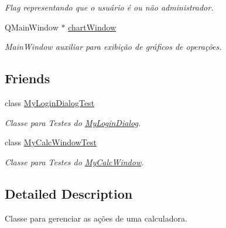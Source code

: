 \begin{DoxyCompactItemize}
\begin{DoxyCompactList}\small\item\em Flag representando que o usuário é ou não administrador. \end{DoxyCompactList}\item 
Q\+Main\+Window $\ast$ \hyperlink{classMyCalcWindow_a98ecf548e0cb3586ff4afc33bdfacb7a}{chart\+Window}\hypertarget{classMyCalcWindow_a98ecf548e0cb3586ff4afc33bdfacb7a}{}\label{classMyCalcWindow_a98ecf548e0cb3586ff4afc33bdfacb7a}

\begin{DoxyCompactList}\small\item\em Main\+Window auxiliar para exibição de gráficos de operações. \end{DoxyCompactList}\end{DoxyCompactItemize}
\subsection*{Friends}
\begin{DoxyCompactItemize}
\item 
class \hyperlink{classMyCalcWindow_aec613ce0d143a48322f72a2b90819fcb}{My\+Login\+Dialog\+Test}\hypertarget{classMyCalcWindow_aec613ce0d143a48322f72a2b90819fcb}{}\label{classMyCalcWindow_aec613ce0d143a48322f72a2b90819fcb}

\begin{DoxyCompactList}\small\item\em Classe para Testes do \hyperlink{classMyLoginDialog}{My\+Login\+Dialog}. \end{DoxyCompactList}\item 
class \hyperlink{classMyCalcWindow_a5eaf2f81c93e423d3a80f10bd41e84f8}{My\+Calc\+Window\+Test}\hypertarget{classMyCalcWindow_a5eaf2f81c93e423d3a80f10bd41e84f8}{}\label{classMyCalcWindow_a5eaf2f81c93e423d3a80f10bd41e84f8}

\begin{DoxyCompactList}\small\item\em Classe para Testes do \hyperlink{classMyCalcWindow}{My\+Calc\+Window}. \end{DoxyCompactList}\end{DoxyCompactItemize}


\subsection{Detailed Description}
Classe para gerenciar as ações de uma calculadora. 

